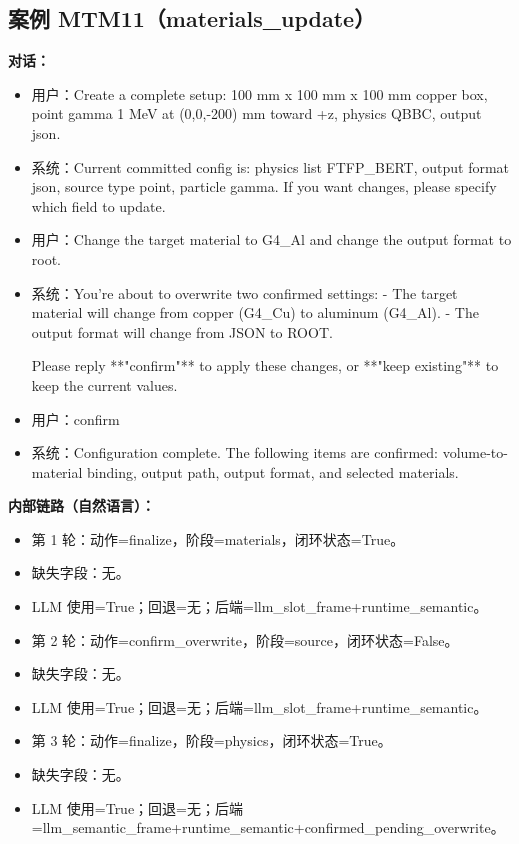 \documentclass[11pt]{ctexart}
\begin{document}
\subsection{案例 MTM11（materials\_update）}
\textbf{对话：}
\begin{itemize}
\item 用户：Create a complete setup: 100 mm x 100 mm x 100 mm copper box, point gamma 1 MeV at (0,0,-200) mm toward +z, physics QBBC, output json.
\item 系统：Current committed config is: physics list FTFP\_BERT, output format json, source type point, particle gamma. If you want changes, please specify which field to update.
\item 用户：Change the target material to G4\_Al and change the output format to root.
\item 系统：You're about to overwrite two confirmed settings:
- The target material will change from copper (G4\_Cu) to aluminum (G4\_Al).
- The output format will change from JSON to ROOT.

Please reply **"confirm"** to apply these changes, or **"keep existing"** to keep the current values.
\item 用户：confirm
\item 系统：Configuration complete. The following items are confirmed: volume-to-material binding, output path, output format, and selected materials.
\end{itemize}
\textbf{内部链路（自然语言）：}
\begin{itemize}
\item 第 1 轮：动作=finalize，阶段=materials，闭环状态=True。
\item 缺失字段：无。
\item LLM 使用=True；回退=无；后端=llm\_slot\_frame+runtime\_semantic。
\item 第 2 轮：动作=confirm\_overwrite，阶段=source，闭环状态=False。
\item 缺失字段：无。
\item LLM 使用=True；回退=无；后端=llm\_slot\_frame+runtime\_semantic。
\item 第 3 轮：动作=finalize，阶段=physics，闭环状态=True。
\item 缺失字段：无。
\item LLM 使用=True；回退=无；后端=llm\_semantic\_frame+runtime\_semantic+confirmed\_pending\_overwrite。
\end{itemize}
\end{document}
